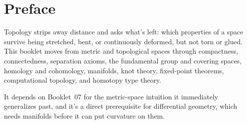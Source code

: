 \chapter*{Preface}

Topology strips away distance and asks what's left: which
properties of a space survive being stretched, bent, or continuously
deformed, but not torn or glued. This booklet moves from metric and
topological spaces through compactness, connectedness, separation
axioms, the fundamental group and covering spaces, homology and
cohomology, manifolds, knot theory, fixed-point theorems, computational
topology, and homotopy type theory.

It depends on Booklet~07 for the metric-space intuition it immediately
generalizes past, and it's a direct prerequisite for differential
geometry, which needs manifolds before it can put curvature on them.
